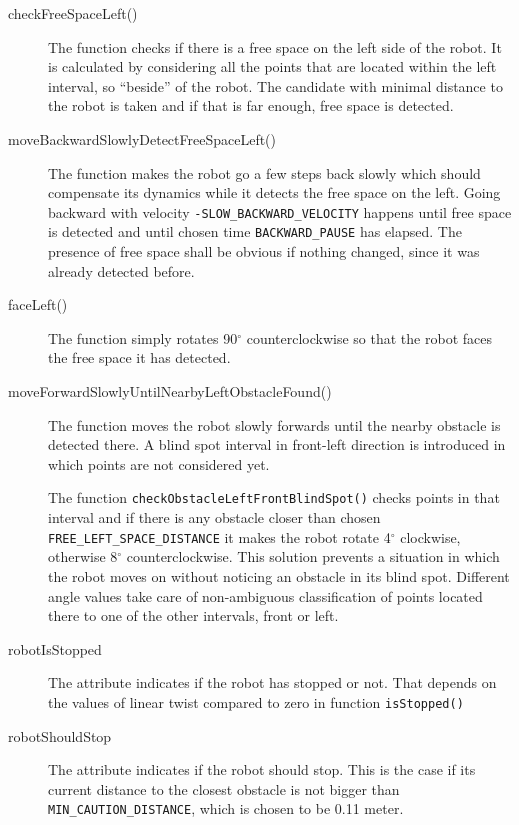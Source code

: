 \begin{description}

\item[checkFreeSpaceLeft()] The function checks if there is a free space on the left side of the robot. It is calculated by considering all the points that are located within the left interval, so ``beside'' of the robot. The candidate with minimal distance to the robot is taken and if that is far enough, free space is detected.

\item[moveBackwardSlowlyDetectFreeSpaceLeft()] The function makes the robot go a few steps back slowly which should compensate its dynamics while it detects the free space on the left. Going backward with velocity  \texttt{-SLOW\_BACKWARD\_VELOCITY} happens until free space is detected and until chosen time \texttt{BACKWARD\_PAUSE} has elapsed. The presence of free space shall be obvious if nothing changed, since it was already detected before.

\item[faceLeft()] The function simply rotates 90$^{\circ}$ counterclockwise so that the robot faces the free space it has detected.

\item[moveForwardSlowlyUntilNearbyLeftObstacleFound()] The function moves the robot slowly forwards until the nearby obstacle is detected there. A blind spot interval in front-left direction is introduced in which points are not considered yet.

The function \texttt{checkObstacleLeftFrontBlindSpot()} checks points in that interval and if there is any obstacle closer than chosen \texttt{FREE\_LEFT\_SPACE\_DISTANCE} it makes the robot rotate 4$^{\circ}$ clockwise, otherwise 8$^{\circ}$ counterclockwise. This solution prevents a situation in which the robot moves on without noticing an obstacle in its blind spot. Different angle values take care of non-ambiguous classification of points located there to one of the other intervals, front or left.

\item[robotIsStopped] The attribute indicates if the robot has stopped or not. That depends on the values of linear twist compared to zero in function \texttt{isStopped()}

\item[robotShouldStop] The attribute indicates if the robot should stop. This is the case if its current distance to the closest obstacle is not bigger than \texttt{MIN\_CAUTION\_DISTANCE}, which is chosen to be 0.11 meter.




\end{description}
